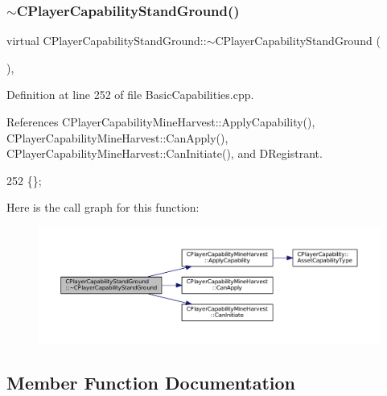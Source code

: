 \subsubsection{\texorpdfstring{$\sim$\+C\+Player\+Capability\+Stand\+Ground()}{~CPlayerCapabilityStandGround()}}
{\footnotesize\ttfamily virtual C\+Player\+Capability\+Stand\+Ground\+::$\sim$\+C\+Player\+Capability\+Stand\+Ground (\begin{DoxyParamCaption}{ }\end{DoxyParamCaption})\hspace{0.3cm}{\ttfamily [inline]}, {\ttfamily [virtual]}}



Definition at line 252 of file Basic\+Capabilities.\+cpp.



References C\+Player\+Capability\+Mine\+Harvest\+::\+Apply\+Capability(), C\+Player\+Capability\+Mine\+Harvest\+::\+Can\+Apply(), C\+Player\+Capability\+Mine\+Harvest\+::\+Can\+Initiate(), and D\+Registrant.


\begin{DoxyCode}
252 \{\};
\end{DoxyCode}
Here is the call graph for this function\+:\nopagebreak
\begin{figure}[H]
\begin{center}
\leavevmode
\includegraphics[width=350pt]{classCPlayerCapabilityStandGround_aa09aba607953849ece673feeb27ef6fd_cgraph}
\end{center}
\end{figure}


\subsection{Member Function Documentation}
\hypertarget{classCPlayerCapabilityStandGround_a3e1beee9125b2a940f803c3234866bb2}{}\label{classCPlayerCapabilityStandGround_a3e1beee9125b2a940f803c3234866bb2} 
